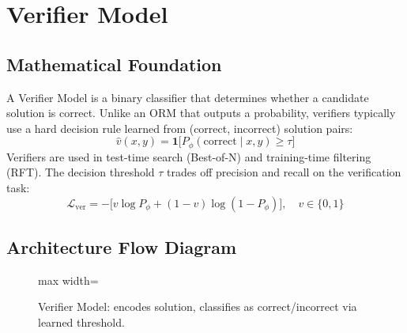 \newpage
\section{Verifier Model}

\subsection{Mathematical Foundation}
A Verifier Model is a binary classifier that determines whether a candidate solution is correct. Unlike an ORM that outputs a probability, verifiers typically use a hard decision rule learned from (correct, incorrect) solution pairs:
\begin{equation}
  \hat{v}(x, y) = \mathbf{1}\bigl[P_\phi(\text{correct} \mid x, y) \geq \tau\bigr]
\end{equation}
Verifiers are used in test-time search (Best-of-N) and training-time filtering (RFT). The decision threshold $\tau$ trades off precision and recall on the verification task:
\begin{equation}
  \mathcal{L}_{\text{ver}} = -\bigl[v\log P_\phi + (1-v)\log(1-P_\phi)\bigr],\quad v \in \{0,1\}
\end{equation}

\subsection{Architecture Flow Diagram}

\begin{figure}[h]
\centering
\begin{adjustbox}{max width=\linewidth}
\end{adjustbox}
\caption{Verifier Model: encodes solution, classifies as correct/incorrect via learned threshold.}
\end{figure}

